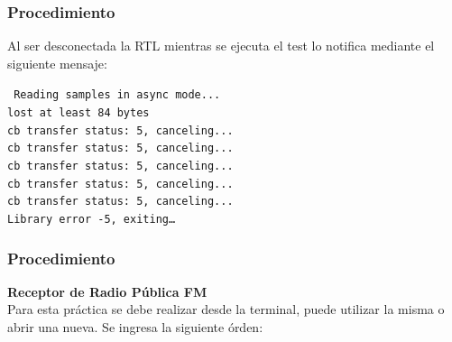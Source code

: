 \begin{frame}
\frametitle{Procedimiento}

Al ser desconectada la RTL mientras se ejecuta el test lo notifica mediante el siguiente mensaje: 

\begin{block}{}
    \texttt{
    Reading samples in async mode... \\
    lost at least 84 bytes \\
    cb transfer status: 5, canceling... \\
    cb transfer status: 5, canceling... \\
    cb transfer status: 5, canceling... \\
    cb transfer status: 5, canceling... \\
    cb transfer status: 5, canceling... \\\vspace{2mm}
    Library error -5, exiting…\\}
\end{block}

\end{frame}

\begin{frame}
\frametitle{Procedimiento}

\textbf{Receptor de Radio Pública FM}\\
\vspace{2mm}
Para esta práctica se debe realizar desde la terminal, puede utilizar la misma o abrir una nueva. Se ingresa la siguiente órden:


\end{frame}

